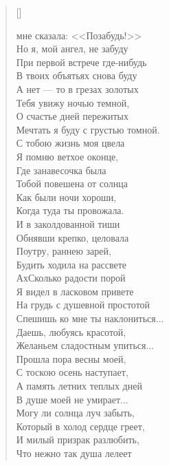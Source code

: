 \newpage

\vspace*{-2cm}


\begin{verse}[\versewidth]
\begin{patverse*}
 мне сказала: <<Позабудь!>>\\
Но я, мой ангел, не забуду\ldotst\\
     При первой встрече где-нибудь\\
В твоих объятьях снова буду\ldotst\\
	  А нет --- то в грезах золотых\\
Тебя увижу ночью темной,\\
      О счастье дней пережитых\\
Мечтать я буду с грустью томной.\\
     С тобою жизнь моя цвела\ldotst\\
Я помню ветхое оконце,\\
     Где занавесочка была\\
Тобой повешена от солнца\ldotst\\
     Как были ночи хороши,\\
Когда туда ты провожала.\\
     И в заколдованной тиши\\
Обнявши крепко, целовала\ldotse\\
     Поутру, раннею зарей,\\
Будить ходила на рассвете\ldotst\\
     Ах\ldotst Сколько радости порой\\
Я видел в ласковом привете\ldotse\\
На грудь с душевной простотой\\
Спешишь ко мне ты наклониться...\\
Даешь, любуясь красотой,\\
Желаньем сладостным упиться...\\
Прошла пора весны моей,\\
С тоскою осень наступает,\\
А память летних теплых дней\\
В душе моей не умирает...\\
Могу ли солнца луч забыть,\\
Который в холод сердце греет,\\
И милый призрак разлюбить,\\
Что нежно так душа лелеет\ldotsq
\end{patverse*}
\end{verse}

